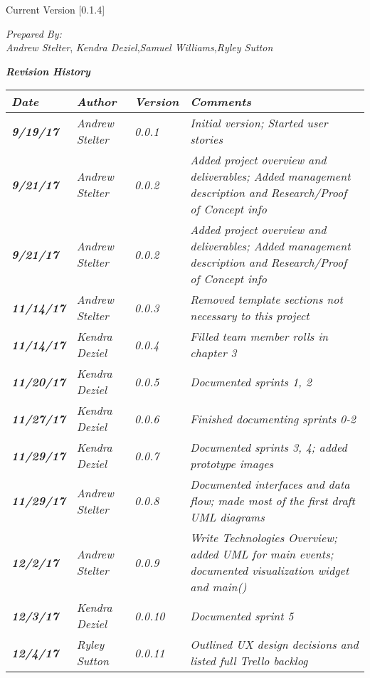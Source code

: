 
Current Version [0.1.4]
\vspace*{5mm}

{\color{SDColor5}
\noindent
\textit{Prepared By:}\\
\textit{Andrew Stelter}, \textit{Kendra Deziel},\textit{Samuel Williams},\textit{Ryley Sutton}
}

\vfill
\noindent
{\color{SDColor3} \textit{\textbf{Revision History}}}\\
\begin{tabular}{|>{\raggedright}p{1.5cm}|>{\raggedright}p{3cm}|>{\raggedright}p{1.5cm}|>{\raggedright}p{9cm}|}
\hline
\textit{\textbf{Date}} &  \textit{\textbf{Author}} & \textit{\textbf{Version}} & \textit{\textbf{Comments}}\tabularnewline
\hline
 \textit{\textbf{9/19/17}} & \textit{Andrew Stelter} & \textit{0.0.1} & \textit{Initial version; Started user stories}\tabularnewline
\hline
\textit{\textbf{9/21/17}} & \textit{Andrew Stelter} & \textit{0.0.2} & \textit{Added project overview and deliverables; Added management description and Research/Proof of Concept info }\tabularnewline
\hline
\textit{\textbf{9/21/17}} & \textit{Andrew Stelter} & \textit{0.0.2} & \textit{Added project overview and deliverables; Added management description and Research/Proof of Concept info }\tabularnewline
\hline
\textit{\textbf{11/14/17}} & \textit{Andrew Stelter} & \textit{0.0.3} & \textit{Removed template sections not necessary to this project}\tabularnewline
\hline
\textit{\textbf{11/14/17}} & \textit{Kendra Deziel} & \textit{0.0.4} & \textit{Filled team member rolls in chapter 3}\tabularnewline
\hline
\textit{\textbf{11/20/17}} & \textit{Kendra Deziel} & \textit{0.0.5} & \textit{Documented sprints 1, 2}\tabularnewline
\hline
\textit{\textbf{11/27/17}} & \textit{Kendra Deziel} & \textit{0.0.6} & \textit{Finished documenting sprints 0-2}\tabularnewline
\hline
\textit{\textbf{11/29/17}} & \textit{Kendra Deziel} & \textit{0.0.7} & \textit{Documented sprints 3, 4; added prototype images}\tabularnewline
\hline
\textit{\textbf{11/29/17}} & \textit{Andrew Stelter} & \textit{0.0.8} & \textit{Documented interfaces and data flow; made most of the first draft UML diagrams}\tabularnewline
\hline
\textit{\textbf{12/2/17}} & \textit{Andrew Stelter} & \textit{0.0.9} & \textit{Write Technologies Overview; added UML for main events; documented visualization widget and main()}\tabularnewline
\hline
\textit{\textbf{12/3/17}} & \textit{Kendra Deziel} & \textit{0.0.10} & \textit{Documented sprint 5}\tabularnewline
\hline
\textit{\textbf{12/4/17}} & \textit{Ryley Sutton} & \textit{0.0.11} & \textit{Outlined UX design decisions and listed full Trello backlog}\tabularnewline

\end{tabular}
